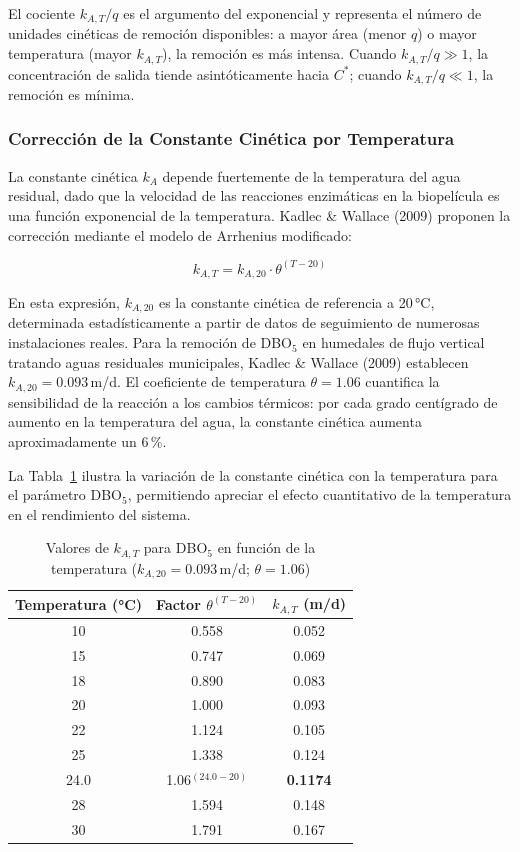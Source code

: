 El cociente $k_{A,T}/q$ es el argumento del exponencial y representa el número de unidades cinéticas de remoción disponibles: a mayor área (menor $q$) o mayor temperatura (mayor $k_{A,T}$), la remoción es más intensa. Cuando $k_{A,T}/q \gg 1$, la concentración de salida tiende asintóticamente hacia $C^*$; cuando $k_{A,T}/q \ll 1$, la remoción es mínima.

\subsubsection*{Corrección de la Constante Cinética por Temperatura}

La constante cinética $k_A$ depende fuertemente de la temperatura del agua residual, dado que la velocidad de las reacciones enzimáticas en la biopelícula es una función exponencial de la temperatura. Kadlec \& Wallace (2009) proponen la corrección mediante el modelo de Arrhenius modificado:

\begin{equation}
k_{A,T} = k_{A,20} \cdot \theta^{(T-20)}
\label{eq:arrhenius}
\end{equation}

En esta expresión, $k_{A,20}$ es la constante cinética de referencia a 20\,°C, determinada estadísticamente a partir de datos de seguimiento de numerosas instalaciones reales. Para la remoción de DBO$_5$ en humedales de flujo vertical tratando aguas residuales municipales, Kadlec \& Wallace (2009) establecen $k_{A,20} = 0.093$\,m/d. El coeficiente de temperatura $\theta = 1.06$ cuantifica la sensibilidad de la reacción a los cambios térmicos: por cada grado centígrado de aumento en la temperatura del agua, la constante cinética aumenta aproximadamente un 6\,\%.

La Tabla~\ref{tab:kAT_temperatura} ilustra la variación de la constante cinética con la temperatura para el parámetro DBO$_5$, permitiendo apreciar el efecto cuantitativo de la temperatura en el rendimiento del sistema.

\begin{table}[H]
\centering
\caption{Valores de $k_{A,T}$ para DBO$_5$ en función de la temperatura ($k_{A,20} = 0.093$\,m/d; $\theta = 1.06$)}
\label{tab:kAT_temperatura}
\begin{tabular}{ccc}
\toprule
\textbf{Temperatura (°C)} & \textbf{Factor $\theta^{(T-20)}$} & \textbf{$k_{A,T}$ (m/d)} \\
\midrule
10 & 0.558 & 0.052 \\
15 & 0.747 & 0.069 \\
18 & 0.890 & 0.083 \\
20 & 1.000 & 0.093 \\
22 & 1.124 & 0.105 \\
25 & 1.338 & 0.124 \\
24.0 & 1.06$^{(24.0-20)}$ & \textbf{0.1174} \\
28 & 1.594 & 0.148 \\
30 & 1.791 & 0.167 \\
\bottomrule
\end{tabular}
\end{table}

